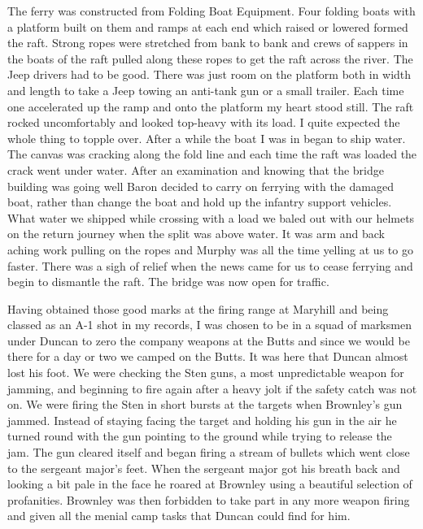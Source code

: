 The ferry was constructed from Folding Boat Equipment. Four folding
boats with a platform built on them and ramps at each end which
raised or lowered formed the raft. Strong ropes were stretched from
bank to bank and crews of sappers in the boats of the raft pulled
along these ropes to get the raft across the river. The Jeep drivers
had to be good. There was just room on the platform both in width and
length to take a Jeep towing an anti-tank gun or a small trailer. Each
time one accelerated up the ramp and onto the platform my heart stood
still. The raft rocked uncomfortably and looked top-heavy with its
load. I quite expected the whole thing to topple over. After a while
the boat I was in began to ship water. The canvas was cracking along
the fold line and each time the raft was loaded the crack went under water. After an examination and knowing that the bridge building was going well \lieutenant Baron decided to carry on ferrying with the damaged boat, rather than change the boat and hold up the infantry support vehicles. What water we shipped while crossing with a load we baled out with our helmets on the return journey when the split was above water. It was arm and back aching work pulling on the ropes and Murphy was all the time yelling at us to go faster. There was a sigh of relief when the news came for us to cease ferrying and begin to dismantle the raft. The bridge was now open for traffic.  


Having obtained those good marks at the firing range at Maryhill and
being classed as an A-1 shot in my records, I was chosen to be in a
squad of marksmen under \sergeantM Duncan to zero the company weapons
at the Butts and since we would be there for a day or two we camped on
the Butts. It was here that \sergeantM Duncan almost lost his foot. We
were checking the Sten guns, a most unpredictable weapon for jamming,
and beginning to fire again after a heavy jolt if the safety catch was
not on. We were firing the Sten in short bursts at the targets when
\sapper Brownley's gun jammed. Instead of staying facing the target
and holding his gun in the air he turned round with the gun pointing
to the ground while trying to release the jam. The gun cleared itself
and began firing a stream of bullets which went close to the sergeant
major's feet. When the sergeant major got his breath back and looking
a bit pale in the face he roared at Brownley using a beautiful
selection of profanities. Brownley was then forbidden to take part in
any more weapon firing and given all the menial camp tasks that Duncan
could find for him.

